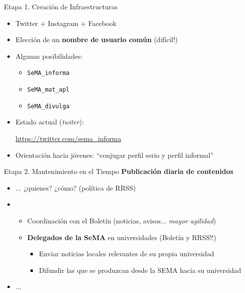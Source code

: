 \begin{frame}
\end{frame}


\begin{frame}{Etapa 1. Creación de Infraestructuras}
    \begin{itemize}
    \item  Twitter $+$ Instagram $+$ Facebook
    \item Elección de un \textbf{nombre de usuario común} (difícil!)
    \item Algunas posibilidades:
      \begin{itemize}
      \item \texttt{SeMA\_informa}
      \item \texttt{SeMA\_mat\_apl}
      \item \texttt{SeMA\_divulga}
      \end{itemize}
    \item Estado actual (\textit{twiter}): \par
      \begin{flushright}
      \url{https://twitter.com/sema\_informa}
    \end{flushright}
  \item Orientación hacia jóvenes: ``conjugar perfil serio y perfil informal''
    \end{itemize}
\end{frame}

\begin{frame}{Etapa 2. Mantenimiento en el Tiempo}
  \textbf{Publicación diaria de contenidos}
    \begin{itemize}
    \item  {}
      \par... ¿quienes? ¿cómo? (política de RRSS)
    \item {}
      \begin{itemize}
      \item Coordinación con el Boletín (noticias,
        avisos...  \textit{mayor agilidad})
      \item {\textbf{Delegados de la SeMA} en universidades} (Boletín y RRSS!!)
        \begin{itemize}
        \item Enviar noticias locales relevantes de su propia
          universidad
        \item Difundir las que se produzcan desde la SEMA hacia su universidad
        \end{itemize}
      \end{itemize}
    \item ...
    \end{itemize}
\end{frame}

